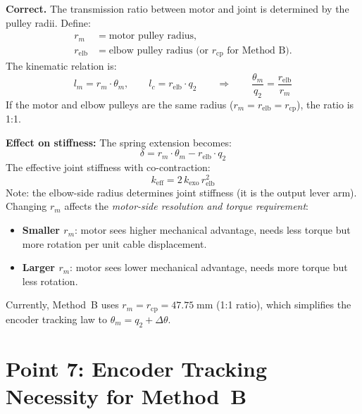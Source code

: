 \documentclass[11pt, a4paper]{article}
\newenvironment{correct}{%
  \begin{mdframed}[backgroundcolor=green!8, linecolor=green!50!black]%
  \textbf{\color{green!50!black}\checkmark\; Correct.}\;}{\end{mdframed}}
\begin{document}
\begin{correct}
The transmission ratio between motor and joint is determined by the pulley
radii.  Define:
%
\begin{align}
  r_m &= \text{motor pulley radius}, \\
  r_{\text{elb}} &= \text{elbow pulley radius (or } r_{\text{cp}} \text{ for Method~B)}.
\end{align}
%
The kinematic relation is:
\begin{equation}
  l_m = r_m \cdot \theta_m, \qquad
  l_c = r_{\text{elb}} \cdot q_2
  \qquad\Rightarrow\qquad
  \frac{\theta_m}{q_2} = \frac{r_{\text{elb}}}{r_m}
\end{equation}
%
If the motor and elbow pulleys are the same radius
($r_m = r_{\text{elb}} = r_{\text{cp}}$), the ratio is 1:1.

\medskip\noindent
\textbf{Effect on stiffness:}
The spring extension becomes:
\begin{equation}
  \delta = r_m \cdot \theta_m - r_{\text{elb}} \cdot q_2
\end{equation}
The effective joint stiffness with co-contraction:
\begin{equation}
  k_{\text{eff}} = 2 \, k_{\text{exo}} \, r_{\text{elb}}^2
\end{equation}
Note: the elbow-side radius determines joint stiffness (it is the output
lever arm).  Changing $r_m$ affects the \emph{motor-side resolution and
torque requirement}:
\begin{itemize}[nosep]
  \item \textbf{Smaller $r_m$}: motor sees higher mechanical advantage,
    needs less torque but more rotation per unit cable displacement.
  \item \textbf{Larger $r_m$}: motor sees lower mechanical advantage,
    needs more torque but less rotation.
\end{itemize}

\noindent
Currently, Method~B uses $r_m = r_{\text{cp}} = 47.75\;\text{mm}$ (1:1
ratio), which simplifies the encoder tracking law to
$\theta_m = q_2 + \Delta\theta$.
\end{correct}


\section{Point 7: Encoder Tracking Necessity for Method~B}
\label{sec:point7}
\end{document}
